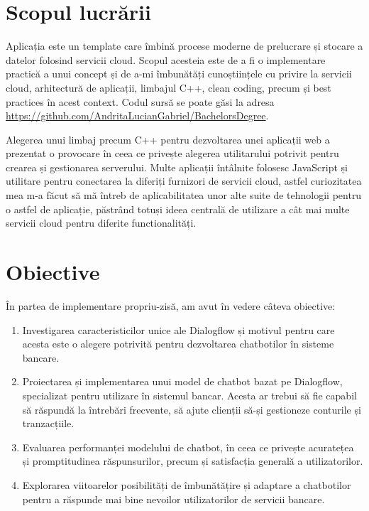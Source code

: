 \section{Scopul lucrării}

Aplicația este un template care îmbină procese moderne de prelucrare și stocare a datelor folosind servicii cloud. Scopul acesteia este de a fi o implementare practică a unui concept și de a-mi îmbunătăți cunoștiințele cu privire la servicii cloud, arhitectură de aplicații, limbajul C++, clean coding, precum și best practices în acest context. Codul sursă se poate găsi la adresa \href{https://github.com/AndritaLucianGabriel/BachelorsDegree}{https://github.com/AndritaLucianGabriel/BachelorsDegree}.

Alegerea unui limbaj precum C++ pentru dezvoltarea unei aplicații web a prezentat o provocare în ceea ce privește alegerea utilitarului potrivit pentru crearea și gestionarea serverului. Multe aplicații întâlnite folosesc JavaScript și utilitare pentru conectarea la diferiți furnizori de servicii cloud, astfel curiozitatea mea m-a făcut să mă întreb de aplicabilitatea unor alte suite de tehnologii pentru o astfel de aplicație, păstrând totuși ideea centrală de utilizare a cât mai multe servicii cloud pentru diferite functionalități.

\section{Obiective}

În partea de implementare propriu-zisă, am avut în vedere câteva obiective:

\begin{enumerate}
    \item Investigarea caracteristicilor unice ale Dialogflow și motivul pentru care acesta este o alegere potrivită pentru dezvoltarea chatbotilor în sisteme bancare.
    \item Proiectarea și implementarea unui model de chatbot bazat pe Dialogflow, specializat pentru utilizare în sistemul bancar. Acesta ar trebui să fie capabil să răspundă la întrebări frecvente, să ajute clienții să-și gestioneze conturile și tranzacțiile.
    \item Evaluarea performanței modelului de chatbot, în ceea ce privește acuratețea și promptitudinea răspunsurilor, precum și satisfacția generală a utilizatorilor.
    \item Explorarea viitoarelor posibilități de îmbunătățire și adaptare a chatbotilor pentru a răspunde mai bine nevoilor utilizatorilor de servicii bancare.
\end{enumerate}

